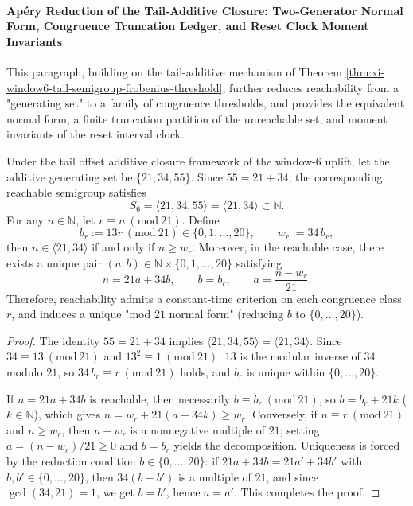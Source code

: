 \paragraph{Ap\'ery Reduction of the Tail-Additive Closure: Two-Generator Normal Form, Congruence Truncation Ledger, and Reset Clock Moment Invariants}
This paragraph, building on the tail-additive mechanism of Theorem \ref{thm:xi-window6-tail-semigroup-frobenius-threshold}, further reduces reachability from a "generating set" to a family of congruence thresholds, and provides the equivalent normal form, a finite truncation partition of the unreachable set, and moment invariants of the reset interval clock.
\par

\begin{theorem}\label{thm:xi-window6-tail-semigroup-two-generator-normal-form}
Under the tail offset additive closure framework of the window-\(6\) uplift, let the additive generating set be \(\{21,34,55\}\).
Since \(55=21+34\), the corresponding reachable semigroup satisfies
\[
S_6=\langle 21,34,55\rangle=\langle 21,34\rangle\subset\mathbb N.
\]
For any \(n\in\mathbb N\), let \(r\equiv n\ (\mathrm{mod}\ 21)\).
Define
\[
b_r:=13r\ (\mathrm{mod}\ 21)\in\{0,1,\dots,20\},
\qquad
w_r:=34\,b_r,
\]
then \(n\in\langle 21,34\rangle\) if and only if \(n\ge w_r\).
Moreover, in the reachable case, there exists a unique pair
\(
(a,b)\in\mathbb N\times\{0,1,\dots,20\}
\)
satisfying
\[
n=21a+34b,\qquad b=b_r,\qquad a=\frac{n-w_r}{21}.
\]
Therefore, reachability admits a constant-time criterion on each congruence class \(r\), and induces a unique "mod \(21\) normal form" (reducing \(b\) to \(\{0,\dots,20\}\)).
\end{theorem}

\begin{proof}
The identity \(55=21+34\) implies \(\langle 21,34,55\rangle=\langle 21,34\rangle\).
Since \(34\equiv 13\ (\mathrm{mod}\ 21)\) and \(13^2\equiv 1\ (\mathrm{mod}\ 21)\), \(13\) is the modular inverse of \(34\) modulo \(21\), so
\(
34\,b_r\equiv r\ (\mathrm{mod}\ 21)
\)
holds, and \(b_r\) is unique within \(\{0,\dots,20\}\).
\par
If \(n=21a+34b\) is reachable, then necessarily \(b\equiv b_r\ (\mathrm{mod}\ 21)\), so \(b=b_r+21k\) (\(k\in\mathbb N\)), which gives
\(
n=w_r+21(a+34k)\ge w_r
\).
Conversely, if \(n\equiv r\ (\mathrm{mod}\ 21)\) and \(n\ge w_r\), then \(n-w_r\) is a nonnegative multiple of \(21\); setting \(a=(n-w_r)/21\ge 0\) and \(b=b_r\) yields the decomposition.
Uniqueness is forced by the reduction condition \(b\in\{0,\dots,20\}\): if \(21a+34b=21a'+34b'\) with \(b,b'\in\{0,\dots,20\}\), then \(34(b-b')\) is a multiple of \(21\), and since \(\gcd(34,21)=1\), we get \(b=b'\), hence \(a=a'\). This completes the proof.
\end{proof}

